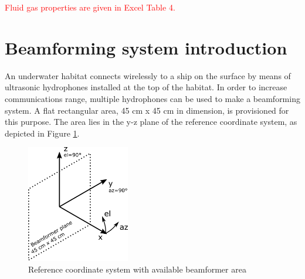 \documentclass[openany]{book}
\begin{document}
	\noindent
	\textcolor{red}{Fluid gas properties are given in Excel Table 4.}
	
	\clearpage
	
	\section{Beamforming system introduction}
	
	An underwater habitat connects wirelessly to a ship on the surface by means 
	of 
	ultrasonic hydrophones installed at the top of the habitat. In order to 
	increase communications range, multiple hydrophones can be used to make a 
	beamforming system. A flat rectangular area, 45 cm x 45 cm in dimension, is 
	provisioned for this purpose. The area lies in the y-z plane of the 
	reference 
	coordinate system, as depicted in Figure \ref{fig:coord}.
	\begin{figure}[h!]
		\centering
		\includegraphics[width=0.4\textwidth]{coord.png}
		\caption{Reference coordinate system with available beamformer area}
		\label{fig:coord}
	\end{figure}
	
\end{document}

